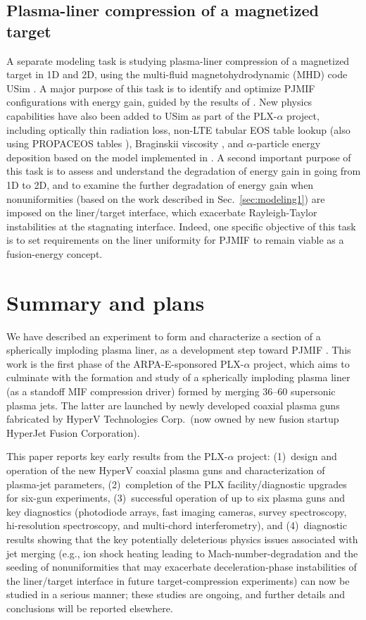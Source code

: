 \documentclass[journal]{IEEEtran}
\begin{document}
\subsection{Plasma-liner compression of a magnetized target}
\label{sec:modeling2}

A separate modeling task is studying plasma-liner compression of a magnetized target in
1D and 2D, using the multi-fluid magnetohydrodynamic (MHD) code USim \cite{beckwith15}.
A major purpose of this task is to identify and optimize PJMIF configurations with energy gain,
guided by the results of \cite{knapp14,langendorf17pop}.
New physics capabilities have also been added to USim
as part of the PLX-$\alpha$ project, including optically thin radiation loss, non-LTE tabular EOS
table lookup (also using PROPACEOS tables \cite{macfarlane06}), Braginskii viscosity 
\cite{braginskii65}, and $\alpha$-particle energy deposition based on the model implemented
in \cite{langendorf17pop}.  A second important purpose of this task is to assess and
understand the degradation of energy gain in going from 1D to 2D, and to examine the further
degradation of energy gain when nonuniformities (based on
the work described in Sec.~\ref{sec:modeling1})
are imposed on the liner/target interface, which exacerbate Rayleigh-Taylor
instabilities at the stagnating interface.  Indeed,
one specific objective of this task is to set requirements on the liner uniformity for PJMIF to
remain viable as a fusion-energy concept.

\section{Summary and plans}
\label{sec:summary}

We have described an experiment to form and characterize a section of a spherically
imploding plasma liner, as a development step toward PJMIF
\cite{thio99,hsu12ieee}.
This work is the first phase of the ARPA-E-sponsored
PLX-$\alpha$ project, which aims to culminate with the formation
and study of a spherically imploding plasma liner (as a standoff MIF compression driver)
formed by merging 36--60 supersonic plasma jets.  The latter are launched by newly 
developed coaxial plasma guns fabricated by HyperV Technologies Corp.\ (now owned
by new fusion startup HyperJet Fusion Corporation).

This paper reports key early results from the PLX-$\alpha$ project:  (1)~design
and operation of the new HyperV coaxial plasma guns and characterization
of plasma-jet parameters, (2)~completion of
the PLX facility/diagnostic upgrades for six-gun experiments, (3)~successful operation of 
up to six plasma guns and key diagnostics (photodiode arrays, fast imaging
cameras, survey spectroscopy,
hi-resolution spectroscopy, and multi-chord interferometry), and (4)~diagnostic results
showing that the key potentially deleterious physics issues associated with jet merging
(e.g., ion shock heating leading to Mach-number-degradation and the seeding of nonuniformities
that may exacerbate deceleration-phase instabilities of the liner/target interface
in future target-compression experiments)
can now be studied in a serious manner; these 
studies are ongoing, and further details and conclusions will be reported elsewhere.
\end{document}
